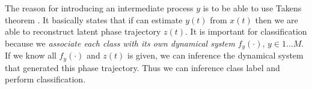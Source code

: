 \documentclass[referee, pdflatex, sn-mathphys-num]{sn-jnl}
\theoremstyle{definition}
\theoremstyle{plain}
\begin{document}
		The reason for introducing an intermediate process $y$ is to be able to use Takens theorem \cite{takens2006detecting}. It basically states that if can estimate $y(t)$ from $x(t)$ then we are able to reconstruct latent phase trajectory $z(t)$. It is important for classification because we \emph{associate each class with its own dynamical system} $f_y(\cdot), \, y \in 1 \ldots M$. If we know all $f_y(\cdot)$ and $z(t)$ is given, we can inference the dynamical system that generated this phase trajectory. Thus we can inference class label and perform classification.
		
		
		
		
		
		
		
		
		
	
 
\end{document}
